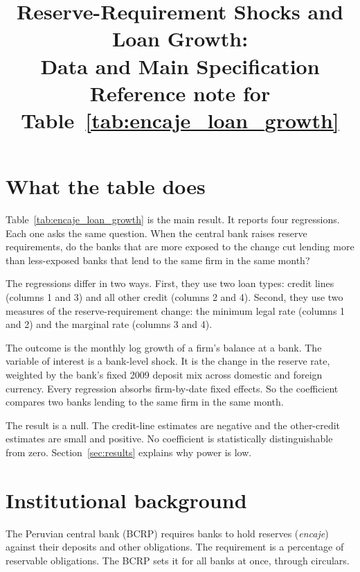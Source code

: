 \documentclass[11pt]{article}
\title{Reserve-Requirement Shocks and Loan Growth:\\ Data and Main Specification\\[0.3em]\large Reference note for Table~\ref{tab:encaje_loan_growth}}
\author{}
\date{}
\renewcommand{\_}{\origunderscore\hspace{0pt}}  %
\begin{document}
\maketitle

\section{What the table does}

Table~\ref{tab:encaje_loan_growth} is the main result.
It reports four regressions.
Each one asks the same question.
When the central bank raises reserve requirements, do the banks that are more exposed to the change cut lending more than less-exposed banks that lend to the same firm in the same month?

The regressions differ in two ways.
First, they use two loan types: credit lines (columns 1 and 3) and all other credit (columns 2 and 4).
Second, they use two measures of the reserve-requirement change: the minimum legal rate (columns 1 and 2) and the marginal rate (columns 3 and 4).

The outcome is the monthly log growth of a firm's balance at a bank.
The variable of interest is a bank-level shock.
It is the change in the reserve rate, weighted by the bank's fixed 2009 deposit mix across domestic and foreign currency.
Every regression absorbs firm-by-date fixed effects.
So the coefficient compares two banks lending to the same firm in the same month.

The result is a null.
The credit-line estimates are negative and the other-credit estimates are small and positive.
No coefficient is statistically distinguishable from zero.
Section~\ref{sec:results} explains why power is low.

\section{Institutional background}

The Peruvian central bank (BCRP) requires banks to hold reserves (\textit{encaje}) against their deposits and other obligations.
The requirement is a percentage of reservable obligations.
The BCRP sets it for all banks at once, through circulars.
\end{document}
